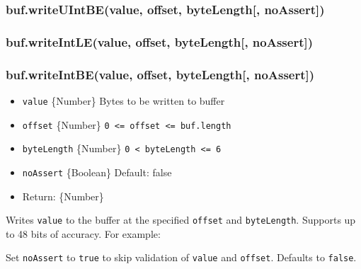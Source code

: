 \subsubsection{buf.writeUIntBE(value, offset, byteLength{[},
noAssert{]})}\label{buf.writeuintbevalue-offset-bytelength-noassert}

\subsubsection{buf.writeIntLE(value, offset, byteLength{[},
noAssert{]})}\label{buf.writeintlevalue-offset-bytelength-noassert}

\subsubsection{buf.writeIntBE(value, offset, byteLength{[},
noAssert{]})}\label{buf.writeintbevalue-offset-bytelength-noassert}

\begin{itemize}
\itemsep1pt\parskip0pt
\item
  \texttt{value} \{Number\} Bytes to be written to buffer
\item
  \texttt{offset} \{Number\}
  \texttt{0\ \textless{}=\ offset\ \textless{}=\ buf.length}
\item
  \texttt{byteLength} \{Number\}
  \texttt{0\ \textless{}\ byteLength\ \textless{}=\ 6}
\item
  \texttt{noAssert} \{Boolean\} Default: false
\item
  Return: \{Number\}
\end{itemize}

Writes \texttt{value} to the buffer at the specified \texttt{offset} and
\texttt{byteLength}. Supports up to 48 bits of accuracy. For example:

\begin{Shaded}
\begin{Highlighting}[]
  \NormalTok{(}\NormalTok{);}
\NormalTok{(}\NormalTok{, }\NormalTok{, }\NormalTok{);}
\end{Highlighting}
\end{Shaded}

Set \texttt{noAssert} to \texttt{true} to skip validation of
\texttt{value} and \texttt{offset}. Defaults to \texttt{false}.

